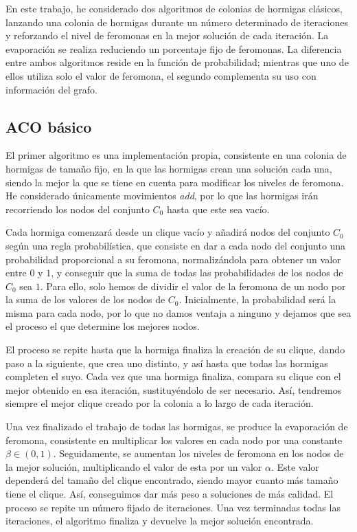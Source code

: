 En este trabajo, he considerado dos algoritmos de colonias de hormigas clásicos,
lanzando una colonia de hormigas durante un número determinado de iteraciones y
reforzando el nivel de feromonas en la mejor solución de cada iteración.
La evaporación se realiza reduciendo un porcentaje fijo de feromonas.
La diferencia entre ambos algoritmos reside en la función de probabilidad;
mientras que uno de ellos utiliza solo el valor de feromona, el segundo complementa
su uso con información del grafo.

\subsection{ACO básico}\label{aco1}

El primer algoritmo es una implementación propia, consistente en una colonia de
hormigas de tamaño fijo, en la que las hormigas crean una solución cada una,
siendo la mejor la que se tiene en cuenta para modificar los niveles de feromona.
He considerado únicamente movimientos \textit{add}, por lo que las hormigas irán
recorriendo los nodos del conjunto $C_0$ hasta que este sea vacío.

Cada hormiga comenzará desde un clique vacío y añadirá nodos del conjunto $C_0$ según
una regla probabilística, que consiste en dar a cada nodo del conjunto una probabilidad
proporcional a su feromona, normalizándola para obtener un valor entre $0$ y $1$, y
conseguir que la suma de todas las probabilidades de los nodos de $C_0$ sea $1$.
Para ello, solo hemos de dividir el valor de la feromona de un nodo por la suma de
los valores de los nodos de $C_0$. Inicialmente, la probabilidad será la misma para
cada nodo, por lo que no damos ventaja a ninguno y dejamos que sea el proceso el
que determine los mejores nodos.

El proceso se repite hasta que la hormiga finaliza la creación de su clique, dando
paso a la siguiente, que crea uno distinto, y así hasta que todas las hormigas completen
el suyo. Cada vez que una hormiga finaliza, compara su clique con el mejor obtenido
en esa iteración, sustituyéndolo de ser necesario. Así, tendremos siempre el mejor
clique creado por la colonia a lo largo de cada iteración.

Una vez finalizado el trabajo de todas las hormigas, se produce la evaporación de
feromona, consistente en multiplicar los valores en cada nodo por una constante $\beta
\in (0, 1)$. Seguidamente, se aumentan los niveles de feromona en los nodos de la mejor
solución, multiplicando el valor de esta por un valor $\alpha$. Este valor dependerá del
tamaño del clique encontrado, siendo mayor cuanto más tamaño tiene el clique. Así,
conseguimos dar más peso a soluciones de más calidad. El proceso se repite un número
fijado de iteraciones. Una vez terminadas todas las iteraciones, el algoritmo finaliza
y devuelve la mejor solución encontrada.

